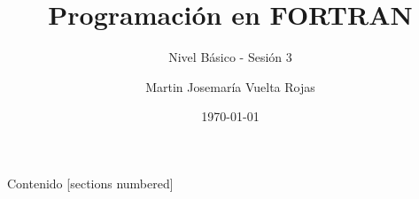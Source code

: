 \documentclass[10pt,aspectratio=96]{beamer}
\begin{document}
  \title{Programación en FORTRAN}
  \subtitle{
    Nivel Básico - Sesión 3
  }
  \date{\today}
  \author{Martin Josemaría Vuelta Rojas}
  \maketitle

  \begin{frame}{Contenido}
    [sections numbered]
    \tableofcontents[hideallsubsections]
  \end{frame}

  
  
  
  
  
  
  
  
  
\end{document}
